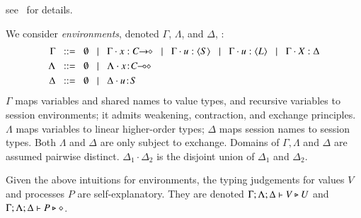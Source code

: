 \documentclass[preprint,11pt]{elsarticle}
\begin{document}
{
see~ for details.



We consider 
\emph{environments}, denoted $\Gamma$, $\Lambda$, and $\Delta$, :
\begin{align*}
		\Gamma  & \bnfis  \emptyset \bnfbar \Gamma \cat \varp{x}: \shot{C} \bnfbar \Gamma \cat u: \chtype{S} \bnfbar \Gamma \cat u: \chtype{L} 
		\bnfbar \Gamma \cat \rvar{X}: \Delta
\\
		\Lambda & \bnfis  \emptyset \bnfbar \Lambda \cat \AT{x}{\lhot{C}}
		 \\
		\Delta   & \bnfis   \emptyset \bnfbar \Delta \cat \AT{u}{S}
\end{align*}
$\Gamma$ maps variables and shared names to value types, and recursive 
variables to session environments; %
it admits weakening, contraction, and exchange principles.
$\Lambda$ maps variables to 
linear
higher-order
types;   $\Delta$  maps   
session names to session types. 
Both $\Lambda$ and $\Delta$
are
only subject to exchange.  
Domains of $\Gamma,
\Lambda$ and $\Delta$ are assumed pairwise distinct. 
$\Delta_1\cdot \Delta_2$ is the disjoint union of $\Delta_1$ and $\Delta_2$.  

Given the above intuitions for environments, 
the typing judgements for values $V$ and processes $P$ are self-explanatory.
They are denoted 
$\Gamma; \Lambda; \Delta \vdash V \triangleright U$ and $\Gamma; \Lambda; \Delta \vdash P \triangleright \diamond$.
%
 
}
\end{document}
